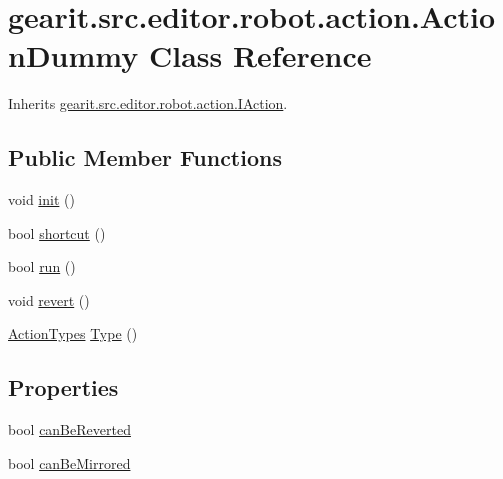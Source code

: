 \hypertarget{classgearit_1_1src_1_1editor_1_1robot_1_1action_1_1_action_dummy}{\section{gearit.\+src.\+editor.\+robot.\+action.\+Action\+Dummy Class Reference}
\label{classgearit_1_1src_1_1editor_1_1robot_1_1action_1_1_action_dummy}
}


Inherits \hyperlink{interfacegearit_1_1src_1_1editor_1_1robot_1_1action_1_1_i_action}{gearit.\+src.\+editor.\+robot.\+action.\+I\+Action}.

\subsection*{Public Member Functions}
\begin{DoxyCompactItemize}
\item 
void \hyperlink{classgearit_1_1src_1_1editor_1_1robot_1_1action_1_1_action_dummy_a73cfc7d9dcc3113436547594bc5495c1}{init} ()
\item 
bool \hyperlink{classgearit_1_1src_1_1editor_1_1robot_1_1action_1_1_action_dummy_a2c69985ca7dccd3fb5992ae3c5b6ba8a}{shortcut} ()
\item 
bool \hyperlink{classgearit_1_1src_1_1editor_1_1robot_1_1action_1_1_action_dummy_a0dd1008a9ef7c80730e045e159602d00}{run} ()
\item 
void \hyperlink{classgearit_1_1src_1_1editor_1_1robot_1_1action_1_1_action_dummy_a88e71de00b3ffdd43996886fd6335d2e}{revert} ()
\item 
\hyperlink{namespacegearit_1_1src_1_1editor_1_1robot_1_1action_a4be0fd46e3952d6135136b20e7b3fc5e}{Action\+Types} \hyperlink{classgearit_1_1src_1_1editor_1_1robot_1_1action_1_1_action_dummy_a97d573d9807083e5e94ca81e51751ce4}{Type} ()
\end{DoxyCompactItemize}
\subsection*{Properties}
\begin{DoxyCompactItemize}
\item 
bool \hyperlink{classgearit_1_1src_1_1editor_1_1robot_1_1action_1_1_action_dummy_a8940705eae76153fee9d9e7ec0a54884}{can\+Be\+Reverted}
\item 
bool \hyperlink{classgearit_1_1src_1_1editor_1_1robot_1_1action_1_1_action_dummy_a9865ea4ec860378a09c5a6c8a50cad45}{can\+Be\+Mirrored}
\end{DoxyCompactItemize}


